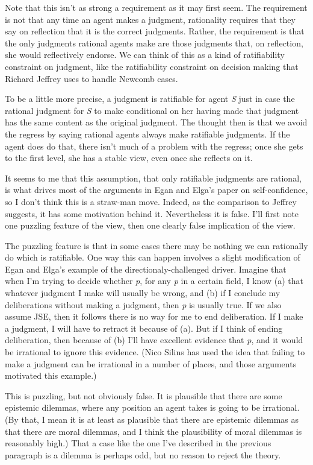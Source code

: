 \documentclass[
  10pt,
  letterpaper,
  DIV=11,
  numbers=noendperiod,
  twoside]{scrartcl}
\begin{document}
Note that this isn't as strong a requirement as it may first seem. The
requirement is not that any time an agent makes a judgment, rationality
requires that they say on reflection that it is the correct judgments.
Rather, the requirement is that the only judgments rational agents make
are those judgments that, on reflection, she would reflectively endorse.
We can think of this as a kind of ratifiability constraint on judgment,
like the ratifiability constraint on decision making that Richard
Jeffrey uses to handle Newcomb cases.

To be a little more precise, a judgment is ratifiable for agent \emph{S}
just in case the rational judgment for \emph{S} to make conditional on
her having made that judgment has the same content as the original
judgment. The thought then is that we avoid the regress by saying
rational agents always make ratifiable judgments. If the agent does do
that, there isn't much of a problem with the regress; once she gets to
the first level, she has a stable view, even once she reflects on it.

It seems to me that this assumption, that only ratifiable judgments are
rational, is what drives most of the arguments in Egan and Elga's paper
on self-confidence, so I don't think this is a straw-man move. Indeed,
as the comparison to Jeffrey suggests, it has some motivation behind it.
Nevertheless it is false. I'll first note one puzzling feature of the
view, then one clearly false implication of the view.

The puzzling feature is that in some cases there may be nothing we can
rationally do which is ratifiable. One way this can happen involves a
slight modification of Egan and Elga's example of the
directionaly-challenged driver. Imagine that when I'm trying to decide
whether \emph{p}, for any \emph{p} in a certain field, I know (a) that
whatever judgment I make will usually be wrong, and (b) if I conclude my
deliberations without making a judgment, then \emph{p} is usually true.
If we also assume JSE, then it follows there is no way for me to end
deliberation. If I make a judgment, I will have to retract it because of
(a). But if I think of ending deliberation, then because of (b) I'll
have excellent evidence that \emph{p}, and it would be irrational to
ignore this evidence. (Nico Silins has used the idea that failing to
make a judgment can be irrational in a number of places, and those
arguments motivated this example.)

This is puzzling, but not obviously false. It is plausible that there
are some epistemic dilemmas, where any position an agent takes is going
to be irrational. (By that, I mean it is at least as plausible that
there are epistemic dilemmas as that there are moral dilemmas, and I
think the plausibility of moral dilemmas is reasonably high.) That a
case like the one I've described in the previous paragraph is a dilemma
is perhaps odd, but no reason to reject the theory.
\end{document}
